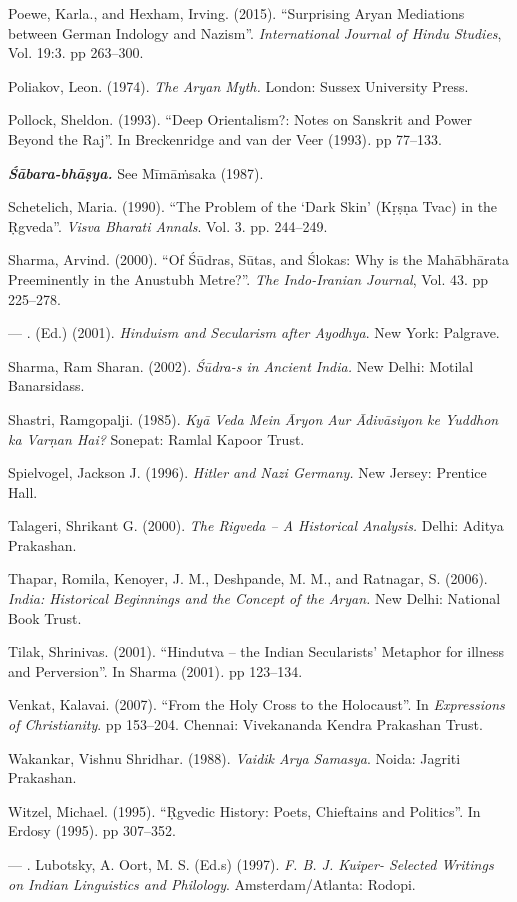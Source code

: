 \begin{thebibliography}{99}
  Poewe, Karla., and Hexham, Irving. (2015). “Surprising Aryan Mediations between German Indology and Nazism”. \textit{International Journal of Hindu Studies}, Vol. 19:3. pp 263--300.

  Poliakov, Leon. (1974). \textit{The Aryan Myth.} London: Sussex University Press.

  Pollock, Sheldon. (1993). “Deep Orientalism?: Notes on Sanskrit and Power Beyond the Raj”. In Breckenridge and van der Veer (1993)\textit{. }pp 77--133.

 \textbf{\textit{Śābara-bhāṣya.}} See Mīmāṁsaka (1987).

  Schetelich, Maria. (1990). “The Problem of the ‘Dark Skin’ (Kṛṣṇa Tvac) in the Ṛgveda”. \textit{Visva Bharati Annals}. Vol. 3. pp. 244--249.
 
  Sharma, Arvind. (2000). “Of Śūdras, Sūtas, and Ślokas: Why is the Mahābhārata Preeminently in the Anustubh Metre?”. \textit{The Indo-Iranian Journal}, Vol. 43. pp 225--278.

  — . (Ed.) (2001). \textit{Hinduism and Secularism after Ayodhya}. New York: Palgrave.

  Sharma, Ram Sharan. (2002). \textit{Śūdra-s in Ancient India.} New Delhi: Motilal Banarsidass.

  Shastri, Ramgopalji. (1985). \textit{Kyā Veda Mein Āryon Aur Ādivāsiyon ke Yuddhon ka Varṇan Hai?} Sonepat: Ramlal Kapoor Trust.

  Spielvogel, Jackson J. (1996). \textit{Hitler and Nazi Germany.} New Jersey: Prentice Hall.

  Talageri, Shrikant G. (2000). \textit{The Rigveda – A Historical Analysis.} Delhi: Aditya Prakashan.

  Thapar, Romila, Kenoyer, J. M., Deshpande, M. M., and Ratnagar, S. (2006). \textit{India: Historical Beginnings and the Concept of the Aryan. }New Delhi: National Book Trust.

  Tilak, Shrinivas. (2001). “Hindutva – the Indian Secularists’ Metaphor for illness and Perversion”. In Sharma (2001)\textit{.} pp 123--134.

  Venkat, Kalavai. (2007). “From the Holy Cross to the Holocaust”. In \textit{Expressions of Christianity}. pp 153--204. Chennai: Vivekananda Kendra Prakashan Trust.

  Wakankar, Vishnu Shridhar. (1988). \textit{Vaidik Arya Samasya}. Noida: Jagriti Prakashan.

  Witzel, Michael. (1995). “Ṛgvedic History: Poets, Chieftains and Politics”. In Erdosy (1995). pp 307--352.

  — . Lubotsky, A. Oort, M. S. (Ed.s) (1997). \textit{F. B. J. Kuiper- Selected Writings on Indian Linguistics and Philology}. Amsterdam/Atlanta: Rodopi.

 \end{thebibliography}

\theendnotes

